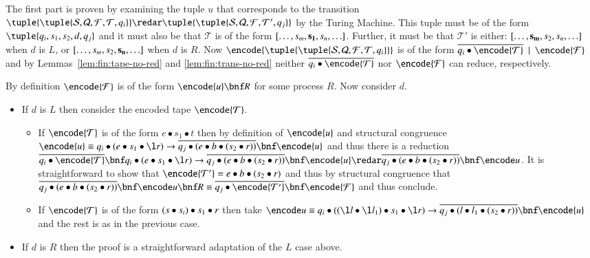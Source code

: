 \documentclass[submission,copyright,creativecommons]{eptcs}
\def\BNF{\ \  | \ \  }
\newenvironment{proof}[1][Proof]{\begin{trivlist}
\item[\hskip \labelsep {\bfseries #1}]}{\end{trivlist}}
\renewcommand{\iap}[1]{#1\to}
\newcommand{\oan}[1]{\overline{#1}}
\newcommand{\tmach}[1]{\tuple{\tuple{#1}}}
\newcommand{\tape}[1]{[#1]}
\begin{document}
\begin{proof}
The first part is proven by examining the tuple $u$ that corresponds to the transition 
$\tmach{{\mathcal S}, {\mathcal Q}, {\mathcal F}, {\mathcal T}, q_i}\redar
\tmach{{\mathcal S}, {\mathcal Q}, {\mathcal F}, {\mathcal T}', q_j}$
by the Turing Machine. This tuple must be of the form
$\tuple{q_i,s_1,s_2,d,q_j}$ and it must also be that ${\mathcal T}$ is of the form
$\tape{\ldots,s_m,{\bf s_1},s_n,\ldots}$.
Further, it must be that ${\mathcal T}'$ is either:
$\tape{\ldots,{\bf s_m},s_2,s_n,\ldots}$ when $d$ is $L$, or
$\tape{\ldots,s_m,s_2,{\bf s_n},\ldots}$ when $d$ is $R$.
Now $\encode{\tmach{{\mathcal S}, {\mathcal Q}, {\mathcal F}, {\mathcal T}, q_i}}$
is of the form
$\oan {q_i\bullet \encode {\mathcal T}} \BNF \encode{{\mathcal F}}$ and
by Lemmas~\ref{lem:fin:tape-no-red} and \ref{lem:fin:trans-no-red} neither $\oan {q_i\bullet \encode {\mathcal T}}$
nor $\encode{{\mathcal F}}$ can reduce, respectively.

By definition $\encode{\mathcal F}$ is of the form
$\encode{u}\bnf R$
for some process $R$. 
Now consider $d$.
\begin{itemize}
\item If $d$ is $L$ then consider the encoded tape $\encode{{\mathcal T}}$.
  \begin{itemize}
  \item If $\encode{{\mathcal T}}$ is of the form $e\bullet s_1\bullet t$
        then by definition of $\encode{u}$ and structural congruence $\encode{u}\equiv
        \iap {q_i\bullet (e\bullet s_1\bullet \l r)}\oan {q_j\bullet (e\bullet b\bullet (s_2\bullet r))}
        \bnf \encode{u}$ and thus there is a reduction
        $\oan {q_i\bullet \encode {\mathcal T}} \bnf
        \iap {q_i\bullet (e\bullet s_1\bullet \l r)}\oan {q_j\bullet (e\bullet b\bullet (s_2\bullet r))}
        \bnf \encode{u}\redar \oan {q_j\bullet(e\bullet b\bullet (s_2\bullet r))}\bnf \encode u$.
        It is straightforward to show that $\encode{{\mathcal T}'}=e\bullet b\bullet (s_2\bullet r)$
        and thus by structural congruence that
        $\oan {q_j\bullet(e\bullet b\bullet (s_2\bullet r))}\bnf \encode u\bnf R\equiv
        \oan {q_j\bullet \encode{{\mathcal T}'}}\bnf \encode{{\mathcal F}}$ and thus conclude.
  \item If $\encode{{\mathcal T}}$ is of the form
        $(\enclist{s_i\bullet s}{s\bullet s_i})\bullet s_1\bullet r$
        then take $\encode u\equiv
        \iap {q_i\bullet ((\enclist{\l l_1\bullet \l l}{\l l\bullet\l l_1})\bullet s_1\bullet \l r)}
        \oan {q_j\bullet (l\bullet l_1\bullet (s_2\bullet r))}
        \bnf \encode{u}$ and the rest is as in the previous case.
  \end{itemize}
\item If $d$ is $R$ then the proof is a straightforward adaptation of the $L$ case above.
\end{itemize}


\end{proof}
\end{document}
